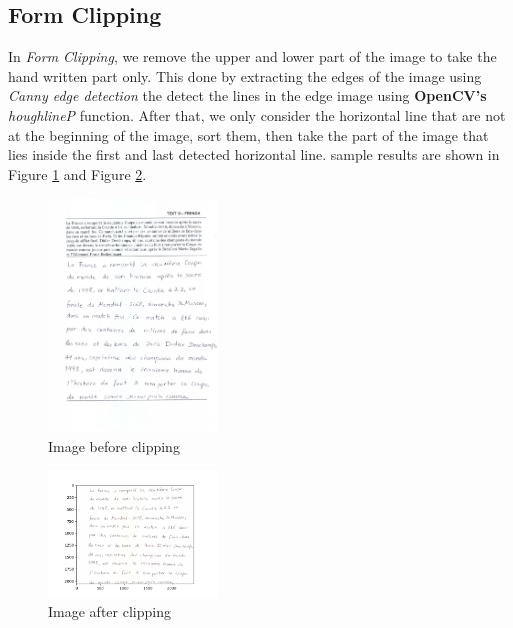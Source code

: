 \subsection{Form Clipping}
In \emph{Form Clipping}, we remove the upper and lower part of the image to take the hand written part only.
This done by extracting the edges of the image using \emph{Canny edge detection} the detect the lines in the edge image using \textbf{OpenCV's} \emph{houghlineP} function.
After that, we only consider the horizontal line that are not at the beginning of the image, sort them, then take the part of the image that lies inside the first and last detected horizontal line.
sample results are shown in Figure \ref{fig:clipping-example} and Figure \ref{fig:clipping-result}.

\begin{figure}[h!]
    \centering
    \includegraphics[width=0.4\textwidth]{images/5.jpeg}
    \caption{Image before clipping}
    \label{fig:clipping-example}
\end{figure}

\begin{figure}[h!]
    \centering
    \includegraphics[width=0.4\textwidth]{images/img5_result.png}
    \caption{Image after clipping}
    \label{fig:clipping-result}
\end{figure}

